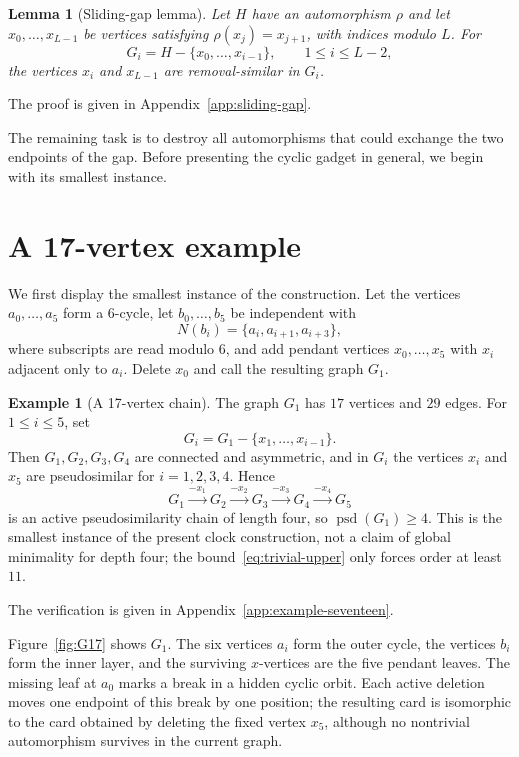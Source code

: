 \documentclass[11pt]{article}
\newtheorem{lemma}[theorem]{Lemma}
\theoremstyle{definition}
\newtheorem{example}[theorem]{Example}
\theoremstyle{remark}
\newcommand{\psd}{\operatorname{psd}}
\begin{document}
\begin{lemma}[Sliding-gap lemma]\label{lem:sliding-gap}
Let $H$ have an automorphism $\rho$ and let $x_0,\ldots,x_{L-1}$ be vertices satisfying $\rho(x_j)=x_{j+1}$, with indices modulo $L$. For
\[
    G_i=H-\{x_0,\ldots,x_{i-1}\},\qquad 1\le i\le L-2,
\]
the vertices $x_i$ and $x_{L-1}$ are removal-similar in $G_i$.
\end{lemma}


\par\noindent The proof is given in Appendix~\ref{app:sliding-gap}.


The remaining task is to destroy all automorphisms that could exchange the two endpoints of the gap. Before presenting the cyclic gadget in general, we begin with its smallest instance.

\section{A 17-vertex example}

We first display the smallest instance of the construction.  Let the vertices $a_0,\ldots,a_5$ form a $6$-cycle, let $b_0,\ldots,b_5$ be independent with
\[
    N(b_i)=\{a_i,a_{i+1},a_{i+3}\},
\]
where subscripts are read modulo $6$, and add pendant vertices $x_0,\ldots,x_5$ with $x_i$ adjacent only to $a_i$.  Delete $x_0$ and call the resulting graph $G_1$.

\begin{example}[A 17-vertex chain]\label{ex:seventeen}
The graph $G_1$ has $17$ vertices and $29$ edges.  For $1\le i\le5$, set
\[
    G_i=G_1-\{x_1,\ldots,x_{i-1}\}.
\]
Then $G_1,G_2,G_3,G_4$ are connected and asymmetric, and in $G_i$ the vertices $x_i$ and $x_5$ are pseudosimilar for $i=1,2,3,4$.  Hence
\[
    G_1 \xrightarrow{-x_1} G_2
        \xrightarrow{-x_2} G_3
        \xrightarrow{-x_3} G_4
        \xrightarrow{-x_4} G_5
\]
is an active pseudosimilarity chain of length four, so $\psd(G_1)\ge4$.  This is the smallest instance of the present clock construction, not a claim of global minimality for depth four; the bound~\eqref{eq:trivial-upper} only forces order at least $11$.
\end{example}

\par\noindent The verification is given in Appendix~\ref{app:example-seventeen}.

Figure~\ref{fig:G17} shows $G_1$.  The six vertices $a_i$ form the outer cycle, the vertices $b_i$ form the inner layer, and the surviving $x$-vertices are the five pendant leaves.  The missing leaf at $a_0$ marks a break in a hidden cyclic orbit.  Each active deletion moves one endpoint of this break by one position; the resulting card is isomorphic to the card obtained by deleting the fixed vertex $x_5$, although no nontrivial automorphism survives in the current graph.
\end{document}
